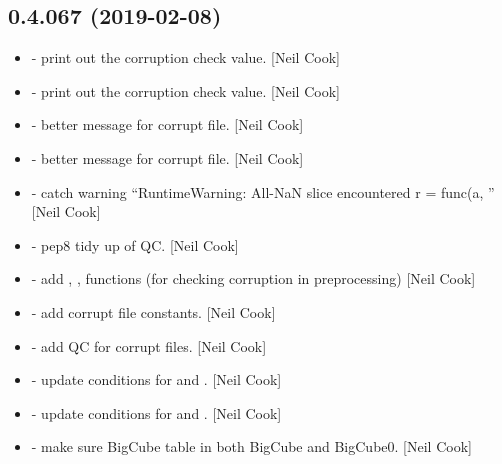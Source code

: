 \documentclass[a4paper,10pt,english]{report}
\begin{document}
\subsection{0.4.067 (2019-02-08)}
\label{\detokenize{misc/changelog:id190}}\begin{itemize}
\item {} 
 - print out the corruption check value. {[}Neil
Cook{]}

\item {} 
 - print out the corruption check value. {[}Neil
Cook{]}

\item {} 
 - better message for corrupt file. {[}Neil
Cook{]}

\item {} 
 - better message for corrupt file. {[}Neil
Cook{]}

\item {} 
 - catch warning “RuntimeWarning: All-NaN slice
encountered r = func(a, ” {[}Neil Cook{]}

\item {} 
 - pep8 tidy up of QC. {[}Neil Cook{]}

\item {} 
 - add , ,
 functions (for checking corruption in
preprocessing) {[}Neil Cook{]}

\item {} 
 - add corrupt file constants. {[}Neil Cook{]}

\item {} 
 - add QC for corrupt files. {[}Neil Cook{]}

\item {} 
 - update conditions for  and .
{[}Neil Cook{]}

\item {} 
 - update conditions for  and .
{[}Neil Cook{]}

\item {} 
 - make sure BigCube table in both BigCube and
BigCube0. {[}Neil Cook{]}


\end{itemize}
\end{document}
